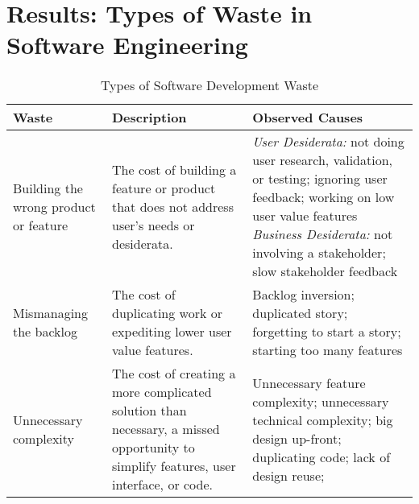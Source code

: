 \section{Results: Types of Waste in Software Engineering}
\label{SEWaste}

\begin{table*}[t]
\renewcommand{\arraystretch}{1.3}
\centering
\caption{Types of Software Development Waste}
\label{Waste}
\begin{tabular}{|p{1.7in}|p{1.9in}|p{3in}|}
\hline
Waste                                 & Description                                                                                                         & Observed Causes                                                                                                                                                                                                                                                                                                                                                                                                                     \\ \hline
Building the wrong product or feature & The cost of building a feature or product that does not address user's needs or desiderata.                                  & \textit{User Desiderata:} not doing user research, validation, or testing; ignoring user feedback; working on low user value features \newline \textit{Business Desiderata:} not involving a stakeholder; slow stakeholder feedback                                                                                                                                                                                  \\ \hline
Mismanaging the backlog               & The cost of duplicating work or expediting lower user value features.                                                       & Backlog inversion; duplicated story; forgetting to start a story; starting too many features                                                                                                                                                                                                                                                                                                                                         \\ \hline
Unnecessary complexity  & The cost of creating a more complicated solution than necessary,  a missed opportunity to simplify features, user interface, or code.      & Unnecessary feature complexity; unnecessary technical complexity; big design up-front; duplicating code; lack of design reuse;                                                                                                                                                                                                                                                                                                                 \\ \hline

\end{tabular}
\end{table*}
